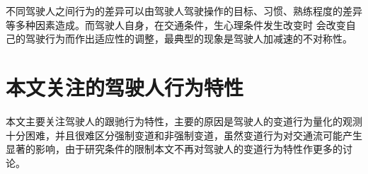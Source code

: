 不同驾驶人之间行为的差异可以由驾驶人驾驶操作的目标、习惯、熟练程度的差异等多种因素造成。而驾驶人自身，在交通条件，生心理条件发生改变时 会改变自己的驾驶行为而作出适应性的调整，最典型的现象是驾驶人加减速的不对称性。
%
%
%
%
%
%

\section{本文关注的驾驶人行为特性}

本文主要关注驾驶人的跟驰行为特性，主要的原因是驾驶人的变道行为量化的观测十分困难，并且很难区分强制变道和非强制变道，虽然变道行为对交通流可能产生显著的影响，由于研究条件的限制本文不再对驾驶人的变道行为特性作更多的讨论。

